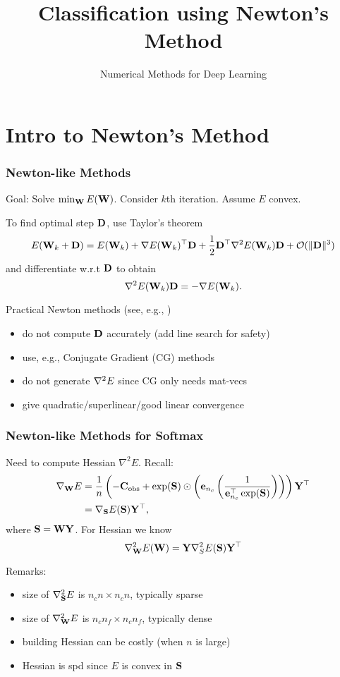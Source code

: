 \documentclass[12pt,fleqn,handout]{beamer}
\title[Newton Softmax]{Classification using Newton's Method}
\subtitle{Numerical Methods for Deep Learning}
\date{}
\begin{document}
\makebeamertitle

\section{Intro to Newton's Method} %
\label{sec:logistic_regression_and_softmax}

\begin{frame}\frametitle{Newton-like Methods}

Goal: Solve $\min_{{\bf W}} E({\bf W})$. Consider $k$th iteration. Assume $E$ convex.

\bigskip
\pause

To find optimal step ${\bf D}$, use Taylor's theorem
{\small{
$$ E({\bf W}_k + {\bf D}) = E({\bf W}_k) + \nabla E({\bf W}_k)^{\top} {\bf D} +
{\frac 12} {\bf D}^{\top} \nabla^2 E({\bf W}_k) {\bf D} +
{\cal O}(\|{\bf D}\|^3)  $$}}
and differentiate w.r.t ${\bf D}$ 
\pause
to obtain
$$ \nabla^2 E({\bf W}_k) {\bf D} = -\nabla E({\bf W}_k). $$

\pause

Practical Newton methods (see, e.g., \cite[Ch.7]{NocedalWright2006})
\begin{itemize}
\item do not compute ${\bf D}$ accurately (add line search for safety)
\item use, e.g., Conjugate Gradient (CG) methods
\item do not generate $\nabla^2 E$ since CG only needs mat-vecs
\item give quadratic/superlinear/good linear convergence
\end{itemize}

\end{frame}

\begin{frame}[fragile]\frametitle{Newton-like Methods for Softmax}

Need to compute Hessian $\nabla^2 E$. Recall: 
\begin{align*}
	\nabla_{{\bf W}}E &= \frac{1}{n} \left( -{\bf C}_{\rm obs} + \exp({\bf S}) \odot 
	\left( {\bf e}_{n_c} \left({\frac {1}{{\bf e}_{n_c}^\top \exp({\bf S})}}\right)\right) \right){\bf Y}^\top\\
              & =  \nabla_{\bf S} E({\bf S}) {\bf Y}^\top,
\end{align*}
where ${\bf S} = {\bf W} {\bf Y}$. 
\pause
For Hessian we know 
$$
\nabla^2_{\bf W} E({\bf W}) = {\bf Y} \nabla_S^2 E({\bf S}) {\bf Y}^\top 
$$

\pause

Remarks:
\begin{itemize}
\item size of $\nabla^2_{\bf S} E$ is $n_c n \times  n_c n$, typically sparse
\item size of $\nabla^2_{\bf W} E$ is $n_c n_f \times n_c n_f$, typically dense
\item building Hessian can be costly (when $n$ is large)
\item Hessian is spd since $E$ is convex in ${\bf S}$
\end{itemize}


\end{frame}
\end{document}
